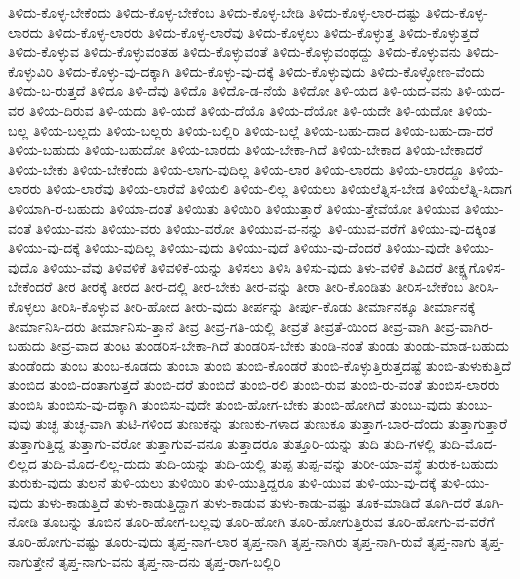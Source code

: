 {ತಿಳಿದು-ಕೊಳ್ಳ-ಬೇಕೆಂದು
ತಿಳಿದು-ಕೊಳ್ಳ-ಬೇಕೆಂಬ
ತಿಳಿದು-ಕೊಳ್ಳ-ಬೇಡಿ
ತಿಳಿದು-ಕೊಳ್ಳ-ಲಾರ-ದಷ್ಟು
ತಿಳಿದು-ಕೊಳ್ಳ-ಲಾರದು
ತಿಳಿದು-ಕೊಳ್ಳ-ಲಾರರು
ತಿಳಿದು-ಕೊಳ್ಳ-ಲಾರೆವು
ತಿಳಿದು-ಕೊಳ್ಳಲು
ತಿಳಿದು-ಕೊಳ್ಳುತ್ತ
ತಿಳಿದು-ಕೊಳ್ಳುತ್ತದೆ
ತಿಳಿದು-ಕೊಳ್ಳುವ
ತಿಳಿದು-ಕೊಳ್ಳುವಂತಹ
ತಿಳಿದು-ಕೊಳ್ಳುವಂತೆ
ತಿಳಿದು-ಕೊಳ್ಳುವಂಥದ್ದು
ತಿಳಿದು-ಕೊಳ್ಳುವನು
ತಿಳಿದು-ಕೊಳ್ಳುವಿರಿ
ತಿಳಿದು-ಕೊಳ್ಳು-ವು-ದಕ್ಕಾಗಿ
ತಿಳಿದು-ಕೊಳ್ಳು-ವು-ದಕ್ಕೆ
ತಿಳಿದು-ಕೊಳ್ಳುವುದು
ತಿಳಿದು-ಕೊಳ್ಳೋಣ-ವೆಂದು
ತಿಳಿದು-ಬ-ರುತ್ತದೆ
ತಿಳಿದೂ
ತಿಳಿ-ದೆವು
ತಿಳಿದೊ
ತಿಳಿದೊ-ಡ-ನೆಯೆ
ತಿಳಿದೋ
ತಿಳಿ-ಯದ
ತಿಳಿ-ಯದ-ವನು
ತಿಳಿ-ಯದ-ವರ
ತಿಳಿಯ-ದಿರುವ
ತಿಳಿ-ಯದು
ತಿಳಿ-ಯದೆ
ತಿಳಿಯ-ದೆಯೊ
ತಿಳಿಯ-ದೆಯೋ
ತಿಳಿ-ಯದೇ
ತಿಳಿ-ಯದೋ
ತಿಳಿಯ-ಬಲ್ಲ
ತಿಳಿಯ-ಬಲ್ಲದು
ತಿಳಿಯ-ಬಲ್ಲರು
ತಿಳಿಯ-ಬಲ್ಲಿರಿ
ತಿಳಿಯ-ಬಲ್ಲೆ
ತಿಳಿಯ-ಬಹು-ದಾದ
ತಿಳಿಯ-ಬಹು-ದಾ-ದರೆ
ತಿಳಿಯ-ಬಹುದು
ತಿಳಿಯ-ಬಹುದೋ
ತಿಳಿಯ-ಬಾರದು
ತಿಳಿಯ-ಬೇಕಾ-ಗಿದೆ
ತಿಳಿಯ-ಬೇಕಾದ
ತಿಳಿಯ-ಬೇಕಾದರೆ
ತಿಳಿಯ-ಬೇಕು
ತಿಳಿಯ-ಬೇಕೆಂದು
ತಿಳಿಯ-ಲಾಗು-ವುದಿಲ್ಲ
ತಿಳಿಯ-ಲಾರ
ತಿಳಿಯ-ಲಾರದು
ತಿಳಿಯ-ಲಾರದ್ದೂ
ತಿಳಿಯ-ಲಾರರು
ತಿಳಿಯ-ಲಾರೆವು
ತಿಳಿಯ-ಲಾರೆವೆ
ತಿಳಿಯಲಿ
ತಿಳಿಯ-ಲಿಲ್ಲ
ತಿಳಿಯಲು
ತಿಳಿಯಲೆತ್ನಿಸ-ಬೇಡ
ತಿಳಿಯಲೆತ್ನಿ-ಸಿದಾಗ
ತಿಳಿಯಾಗಿ-ರ-ಬಹುದು
ತಿಳಿಯಾ-ದಂತೆ
ತಿಳಿಯಿತು
ತಿಳಿಯಿರಿ
ತಿಳಿಯುತ್ತಾರೆ
ತಿಳಿಯು-ತ್ತೇವೆಯೋ
ತಿಳಿಯುವ
ತಿಳಿಯು-ವಂತೆ
ತಿಳಿಯು-ವನು
ತಿಳಿಯು-ವರು
ತಿಳಿಯು-ವರೋ
ತಿಳಿಯುವ-ವ-ನನ್ನು
ತಿಳಿ-ಯುವ-ವರೆಗೆ
ತಿಳಿಯು-ವು-ದಕ್ಕಿಂತ
ತಿಳಿಯು-ವು-ದಕ್ಕೆ
ತಿಳಿಯು-ವುದಿಲ್ಲ
ತಿಳಿಯು-ವುದು
ತಿಳಿಯು-ವುದೆ
ತಿಳಿಯು-ವು-ದೆಂದರೆ
ತಿಳಿಯು-ವುದೇ
ತಿಳಿಯು-ವುದೊ
ತಿಳಿಯು-ವೆವು
ತಿಳಿವಳಿಕೆ
ತಿಳಿವಳಿಕೆ-ಯನ್ನು
ತಿಳಿಸಲು
ತಿಳಿಸಿ
ತಿಳಿಸು-ವುದು
ತಿಳು-ವಳಿಕೆ
ತಿವಿದರೆ
ತೀಕ್ಷ್ಣಗೊಳಿಸ-ಬೇಕೆಂದರೆ
ತೀರ
ತೀರಕ್ಕೆ
ತೀರದ
ತೀರ-ದಲ್ಲಿ
ತೀರ-ಬೇಕು
ತೀರ-ವನ್ನು
ತೀರಾ
ತೀರಿ-ಕೊಂಡಿತು
ತೀರಿಸ-ಬೇಕೆಂಬ
ತೀರಿಸಿ-ಕೊಳ್ಳಲು
ತೀರಿಸಿ-ಕೊಳ್ಳುವ
ತೀರಿ-ಹೋದ
ತೀರು-ವುದು
ತೀರ್ಪನ್ನು
ತೀರ್ಪು-ಕೊಡು
ತೀರ್ಮಾನಕ್ಕೂ
ತೀರ್ಮಾನಕ್ಕೆ
ತೀರ್ಮಾನಿಸಿ-ದರು
ತೀರ್ಮಾನಿಸು-ತ್ತಾನೆ
ತೀವ್ರ
ತೀವ್ರ-ಗತಿ-ಯಲ್ಲಿ
ತೀವ್ರತೆ
ತೀವ್ರತೆ-ಯಿಂದ
ತೀವ್ರ-ವಾಗಿ
ತೀವ್ರ-ವಾಗಿರ-ಬಹುದು
ತೀವ್ರ-ವಾದ
ತುಂಟ
ತುಂಡರಿಸ-ಬೇಕಾ-ಗಿದೆ
ತುಂಡರಿಸ-ಬೇಕು
ತುಂಡಿ-ನಂತೆ
ತುಂಡು
ತುಂಡು-ಮಾಡ-ಬಹುದು
ತುಂಡೆಂದು
ತುಂಬ
ತುಂಬ-ಕೂಡದು
ತುಂಬಾ
ತುಂಬಿ
ತುಂಬಿ-ಕೊಂಡರೆ
ತುಂಬಿ-ಕೊಳ್ಳುತ್ತಿರುತ್ತದಷ್ಟೆ
ತುಂಬಿ-ತುಳುಕುತ್ತಿದೆ
ತುಂಬಿದ
ತುಂಬಿ-ದಂತಾಗುತ್ತದೆ
ತುಂಬಿ-ದರೆ
ತುಂಬಿದೆ
ತುಂಬಿ-ರಲಿ
ತುಂಬಿ-ರುವ
ತುಂಬಿ-ರು-ವಂತೆ
ತುಂಬಿಸ-ಲಾರರು
ತುಂಬಿಸಿ
ತುಂಬಿಸು-ವು-ದಕ್ಕಾಗಿ
ತುಂಬಿಸು-ವುದೇ
ತುಂಬಿ-ಹೋಗ-ಬೇಕು
ತುಂಬಿ-ಹೋಗಿದೆ
ತುಂಬು-ವುದು
ತುಂಬು-ವುವು
ತುಚ್ಛ
ತುಚ್ಛ-ವಾಗಿ
ತುಟಿ-ಗಳಿಂದ
ತುಣುಕನ್ನು
ತುಣುಕು-ಗಳಾದ
ತುಣುಕೂ
ತುತ್ತಾಗ-ಬಾರ-ದೆಂದು
ತುತ್ತಾಗುತ್ತಾರೆ
ತುತ್ತಾಗುತ್ತಿದ್ದ
ತುತ್ತಾಗು-ವರೋ
ತುತ್ತಾಗುವ-ವನೂ
ತುತ್ತಾದರೂ
ತುತ್ತೂರಿ-ಯನ್ನು
ತುದಿ
ತುದಿ-ಗಳಲ್ಲಿ
ತುದಿ-ಮೊದ-ಲಿಲ್ಲದ
ತುದಿ-ಮೊದ-ಲಿಲ್ಲ-ದುದು
ತುದಿ-ಯನ್ನು
ತುದಿ-ಯಲ್ಲಿ
ತುಪ್ಪ
ತುಪ್ಪ-ವನ್ನು
ತುರೀ-ಯಾ-ವಸ್ಥೆ
ತುರುಕ-ಬಹುದು
ತುರುಕು-ವುದು
ತುಲನೆ
ತುಳಿ-ಯಲು
ತುಳಿಯಿರಿ
ತುಳಿ-ಯುತ್ತಿದ್ದರೂ
ತುಳಿ-ಯುವ
ತುಳಿ-ಯು-ವು-ದಕ್ಕೆ
ತುಳಿ-ಯು-ವುದು
ತುಳು-ಕಾಡುತ್ತಿದೆ
ತುಳು-ಕಾಡುತ್ತಿದ್ದಾಗ
ತುಳು-ಕಾಡುವ
ತುಳು-ಕಾಡು-ವಷ್ಟು
ತೂಕ-ಮಾಡಿದೆ
ತೂಗಿ-ದರೆ
ತೂಗಿ-ನೋಡಿ
ತೂಬನ್ನು
ತೂಬಿನ
ತೂರಿ-ಹೋಗ-ಬಲ್ಲವು
ತೂರಿ-ಹೋಗಿ
ತೂರಿ-ಹೋಗುತ್ತಿರುವ
ತೂರಿ-ಹೋಗು-ವ-ವರೆಗೆ
ತೂರಿ-ಹೋಗು-ವಷ್ಟು
ತೂರು-ವುದು
ತೃಪ್ತ-ನಾಗ-ಲಾರ
ತೃಪ್ತ-ನಾಗಿ
ತೃಪ್ತ-ನಾಗಿರು
ತೃಪ್ತ-ನಾಗಿ-ರುವೆ
ತೃಪ್ತ-ನಾಗು
ತೃಪ್ತ-ನಾಗುತ್ತೇನೆ
ತೃಪ್ತ-ನಾಗು-ವನು
ತೃಪ್ತ-ನಾ-ದನು
ತೃಪ್ತ-ರಾಗ-ಬಲ್ಲಿರಿ
}
